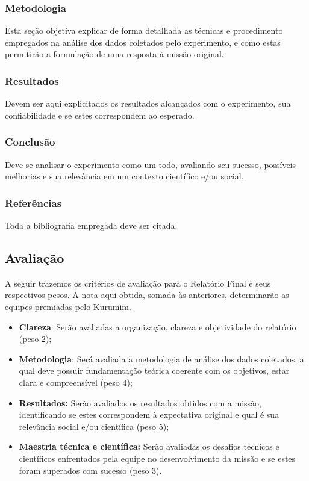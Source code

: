         \subsubsection{Metodologia}
            Esta seção objetiva explicar de forma detalhada as técnicas e procedimento empregados na análise dos dados coletados pelo experimento, e como estas permitirão a formulação de uma resposta à missão original.

        \subsubsection{Resultados}
            Devem ser aqui explicitados os resultados alcançados com o experimento, sua confiabilidade e se estes correspondem ao esperado.

        \subsubsection{Conclusão}
            Deve-se analisar o experimento como um todo, avaliando seu sucesso, possíveis melhorias e sua relevância em um contexto científico e/ou social.

        \subsubsection{Referências}
            Toda a bibliografia empregada deve ser citada.

     \subsection{Avaliação}
        A seguir trazemos os critérios de avaliação para o Relatório Final e seus respectivos pesos. A nota aqui obtida, somada às anteriores, determinarão as equipes premiadas pelo Kurumim.
        
        \begin{itemize}
            \item \textbf{Clareza}: Serão avaliadas a organização, clareza e objetividade do relatório (peso 2);
            
            \item \textbf{Metodologia}: Será avaliada a metodologia de análise dos dados coletados, a qual deve possuir fundamentação teórica coerente com os objetivos, estar clara e compreensível (peso 4);

            \item \textbf{Resultados:} Serão avaliados os resultados obtidos com a missão, identificando se estes correspondem à expectativa original e qual é sua relevância social e/ou científica (peso 5);

            \item \textbf{Maestria técnica e científica:} Serão avaliadas os desafios técnicos e científicos enfrentados pela equipe no desenvolvimento da missão e se estes foram superados com sucesso (peso 3).
        \end{itemize}
        
